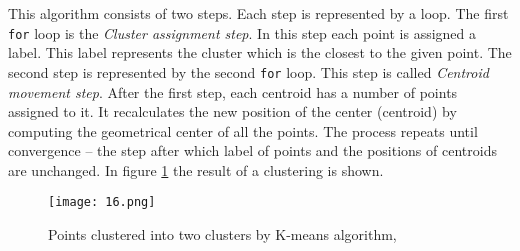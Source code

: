       \newline
      This algorithm consists of two steps. Each step is represented by a loop. The first \verb|for| loop is the \emph{Cluster assignment step}. In this step each point is assigned a label. This label represents the cluster which is the closest to the given point. The second step is represented by the second \verb|for| loop. This step is called \emph{Centroid movement step}. After the first step, each centroid has a number of points assigned to it. It recalculates the new position of the center (centroid) by computing the geometrical center of all the points. The process repeats until convergence -- the step after which label of points and the positions of centroids are unchanged.
        In figure \ref{pointsAndClusters} the result of a clustering is shown. 
              \begin{figure}[h!]
        \centering
        \texttt{[image: 16.png]} 
        \caption{Points clustered into two clusters by K-means algorithm, \cite{slides}}
        \label{pointsAndClusters}
      \end{figure}

